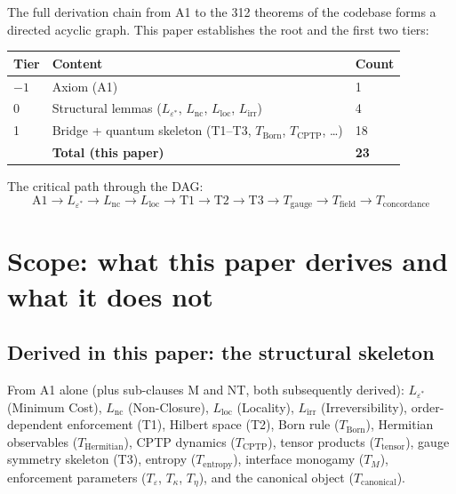 \documentclass[11pt]{article}
\begin{document}
The full derivation chain from A1 to the 312 theorems of the codebase forms a directed acyclic graph.  This paper establishes the root and the first two tiers:

\begin{center}
\begin{tabular}{lll}
\toprule
\textbf{Tier} & \textbf{Content} & \textbf{Count} \\
\midrule
$-1$ & Axiom (A1) & 1 \\
0 & Structural lemmas ($L_{\varepsilon^*}$, $L_{\mathrm{nc}}$, $L_{\mathrm{loc}}$, $L_{\mathrm{irr}}$) & 4 \\
1 & Bridge + quantum skeleton (T1--T3, $T_{\mathrm{Born}}$, $T_{\mathrm{CPTP}}$, \ldots) & 18 \\
\midrule
& \textbf{Total (this paper)} & \textbf{23} \\
\bottomrule
\end{tabular}
\end{center}

The critical path through the DAG:
\[
\text{A1} \to L_{\varepsilon^*} \to L_{\mathrm{nc}} \to L_{\mathrm{loc}} \to \text{T1} \to \text{T2} \to \text{T3} \to T_{\mathrm{gauge}} \to T_{\mathrm{field}} \to T_{\mathrm{concordance}}
\]


\section{Scope: what this paper derives and what it does not}

\subsection{Derived in this paper: the structural skeleton}

From A1 alone (plus sub-clauses M and NT, both subsequently derived): $L_{\varepsilon^*}$ (Minimum Cost), $L_{\mathrm{nc}}$ (Non-Closure), $L_{\mathrm{loc}}$ (Locality), $L_{\mathrm{irr}}$ (Irreversibility), order-dependent enforcement (T1), Hilbert space (T2), Born rule ($T_{\mathrm{Born}}$), Hermitian observables ($T_{\mathrm{Hermitian}}$), CPTP dynamics ($T_{\mathrm{CPTP}}$), tensor products ($T_{\mathrm{tensor}}$), gauge symmetry skeleton (T3), entropy ($T_{\mathrm{entropy}}$), interface monogamy ($T_M$), enforcement parameters ($T_\varepsilon$, $T_\kappa$, $T_\eta$), and the canonical object ($T_{\mathrm{canonical}}$).
\end{document}
